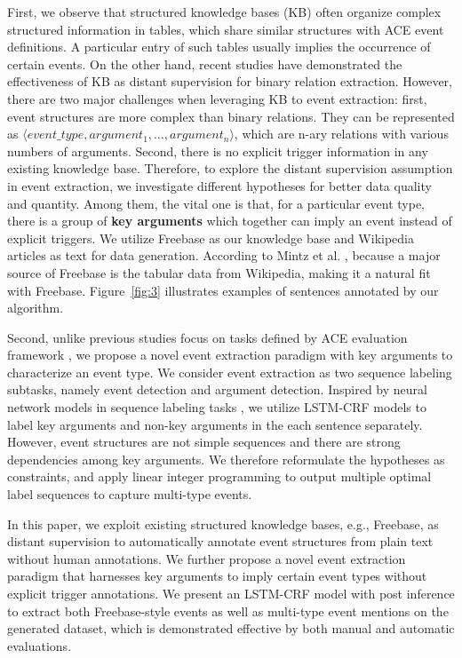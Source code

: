 First, we observe that structured knowledge bases (KB) often organize
complex structured information in tables, which share similar structures with ACE event definitions. A particular entry of such tables usually implies the occurrence of certain events.
On the other hand, recent studies \cite{mintz2009distant,zeng2015distant} have demonstrated the effectiveness of KB as distant supervision for binary relation extraction.
However, there are two major challenges when leveraging KB to event extraction: first, event structures are more complex than binary relations. They can be represented as $\langle event\_type, argument_1, \ldots, argument_n\rangle$, which are n-ary relations with various numbers of arguments. Second, there is no explicit trigger information in any existing knowledge base. Therefore, to explore the distant supervision assumption in event extraction, we investigate different hypotheses for better data quality and quantity. Among them, the vital one is that, for a particular event type, there is a group of \textbf{key arguments} which together can imply an event instead of explicit triggers.
We utilize Freebase as our knowledge base and Wikipedia articles as text for data generation. According to Mintz et al. , because a major source of Freebase is the tabular data from Wikipedia, making it a natural fit with Freebase. Figure~\ref{fig:3} illustrates examples of sentences annotated by our algorithm.

Second, unlike previous studies focus on tasks defined by ACE evaluation framework \cite{ahn2006stages,li2013joint,chen2015event,nguyen2016joint}, we propose a novel event extraction paradigm with key arguments to characterize an event type. We consider event extraction as two sequence labeling subtasks, namely event detection and argument detection. Inspired by neural network models in sequence labeling tasks \cite{huang2015bidirectional,lample2016neural}, we utilize LSTM-CRF models to label key arguments and non-key arguments in the each sentence separately. However, event structures are not simple sequences and there are strong dependencies among key arguments. We therefore reformulate the hypotheses as constraints, and apply linear integer programming to output multiple optimal label sequences to capture multi-type events. 

In this paper, we exploit existing structured knowledge bases, e.g., Freebase, as distant supervision to automatically annotate event structures from plain text without human annotations. We further propose a novel event extraction paradigm that harnesses key arguments to imply certain event types without explicit trigger annotations. We present an LSTM-CRF model with post inference to extract both Freebase-style events as well as multi-type event mentions on the generated dataset, which is demonstrated effective by both manual and automatic evaluations.
